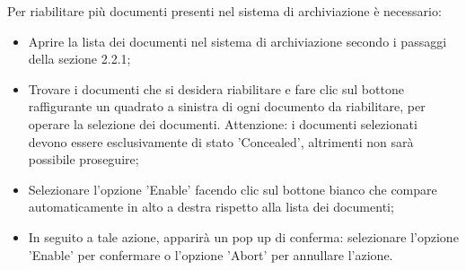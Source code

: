 \documentclass[10pt, a4paper]{article}
\begin{document}
Per riabilitare più documenti presenti nel sistema di archiviazione è necessario:
\begin{itemize}
    \item Aprire la lista dei documenti nel sistema di archiviazione secondo i passaggi della sezione 2.2.1;
    \item Trovare i documenti che si desidera riabilitare e fare clic sul bottone raffigurante un quadrato a sinistra di ogni documento da riabilitare, per operare la selezione dei documenti. Attenzione: i documenti selezionati devono essere esclusivamente di stato 'Concealed', altrimenti non sarà possibile proseguire;
    \item Selezionare l'opzione 'Enable' facendo clic sul bottone bianco che compare automaticamente in alto a destra rispetto alla lista dei documenti; 
    \item In seguito a tale azione, apparirà un pop up di conferma: selezionare l'opzione 'Enable' per confermare o l'opzione 'Abort' per annullare l'azione.
\end{itemize}
\end{document}
